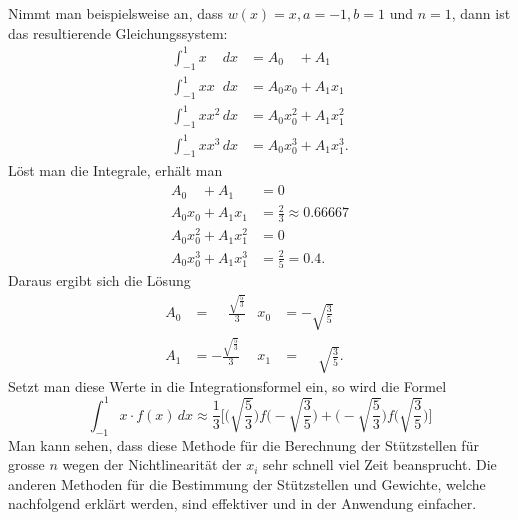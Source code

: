 Nimmt man beispielsweise an, dass $w(x) = x, a = -1, b = 1$ und $n = 1$, 
dann ist das resultierende Gleichungssystem:
\begin{align}
    \int_{-1}^{1} x \phantom{x^{0}} \, dx &= A_{0}\phantom{x^{0}} + A_{1}\phantom{x^{0}} \\
    \int_{-1}^{1} x x^{\phantom{2}} \, dx &= A_{0}x_{0} + A_{1}x_{1} \\
    \int_{-1}^{1} x x^{2} \, dx &= A_{0}x_{0}^{2} + A_{1}x_{1}^{2} \\
    \int_{-1}^{1} x x^{3} \, dx &= A_{0}x_{0}^{3} + A_{1}x_{1}^{3}. 
\end{align}
Löst man die Integrale, erhält man
\begin{align}
    A_{0}\phantom{x^{0}} + A_{1}\phantom{x^{0}} &= 0 \\
    A_{0}x_{0} + A_{1}x_{1} &= \frac{2}{3} \approx 0.66667 \\
    A_{0}x_{0}^{2} + A_{1}x_{1}^{2} &= 0 \\
    A_{0}x_{0}^{3} + A_{1}x_{1}^{3} &= \frac{2}{5} = 0.4.
\end{align}
Daraus ergibt sich die Lösung
\begin{align}
    A_{0} &= \phantom{-}\frac{\sqrt{\frac{5}{3}}}{3} & x_{0} &= -\sqrt{\frac{3}{5}} & \\
    A_{1} &= -\frac{\sqrt{\frac{5}{3}}}{3} & x_{1} &= \phantom{-}\sqrt{\frac{3}{5}}. &
\end{align}
Setzt man diese Werte in die Integrationsformel ein, so wird die Formel
\begin{equation}
    \int_{-1}^{1}x \cdot f(x)\,dx 
    \approx 
    \frac{1}{3} 
    \bigg[ 
        \biggl(\sqrt{\frac{5}{3}}\biggr)
        f\biggl(-\sqrt{\frac{3}{5}}\biggr) 
        + 
        \biggl(-\sqrt{\frac{5}{3}}\biggr)
        f\biggl(\sqrt{\frac{3}{5}}\biggr)
    \bigg]
\end{equation}
Man kann sehen, dass diese Methode für die Berechnung der Stützstellen 
für grosse $n$ wegen der Nichtlinearität der $x_{i}$ sehr schnell viel Zeit beansprucht.
Die anderen Methoden für die Bestimmung der Stützstellen 
und Gewichte, welche nachfolgend erklärt werden, sind effektiver und in der Anwendung einfacher.

